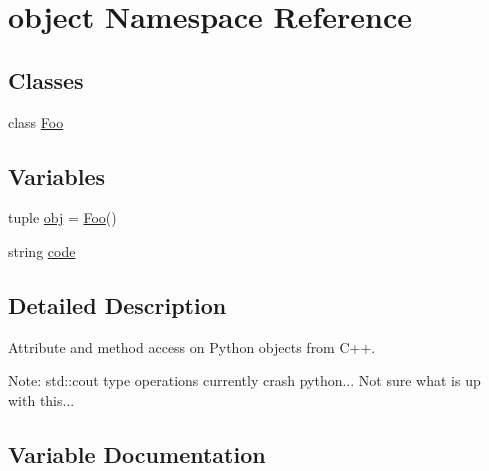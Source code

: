 \hypertarget{namespaceobject}{}\section{object Namespace Reference}
\label{namespaceobject}
\subsection*{Classes}
\begin{DoxyCompactItemize}
\item 
class \hyperlink{classobject_1_1Foo}{Foo}
\end{DoxyCompactItemize}
\subsection*{Variables}
\begin{DoxyCompactItemize}
\item 
tuple \hyperlink{namespaceobject_a25711dde7eabb29a638a5a93177fe5c5}{obj} = \hyperlink{classobject_1_1Foo}{Foo}()
\item 
string \hyperlink{namespaceobject_a9e209a145a833747e51712b7e234b7e2}{code}
\end{DoxyCompactItemize}


\subsection{Detailed Description}
\begin{DoxyVerb}Attribute and method access on Python objects from C++.

Note: std::cout type operations currently crash python...
      Not sure what is up with this...
\end{DoxyVerb}
 

\subsection{Variable Documentation}
\hypertarget{namespaceobject_a9e209a145a833747e51712b7e234b7e2}{}
